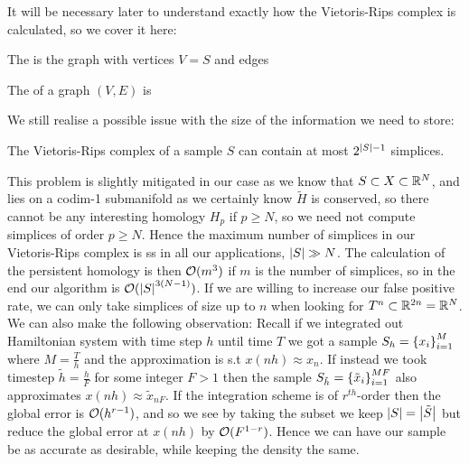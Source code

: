 \documentclass{article}
\begin{document}
\begin{aside}
	It will be necessary later to understand exactly how the Vietoris-Rips complex is calculated, so we cover it here:
	\begin{definition}
		The  is the graph with vertices $V=S$ and edges 
	\end{definition}
\begin{definition}
	The  of a graph $(V,E)$ is 
\end{definition}
\end{aside}

We still realise a possible issue with the size of the information we need to store:

\begin{lemma}
	The Vietoris-Rips complex of a sample $S$ can contain at most $2^{\left\lvert S \right\rvert-1}$ simplices.  
\end{lemma}

This problem is slightly mitigated in our case as we know that $S \subset X \subset \mathbb{R}^N$, and lies on a codim-1 submanifold as we certainly know $\tilde{H}$ is conserved, so there cannot be any interesting homology $H_p$ if $p \geq N$, so we need not compute simplices of order $p \geq N$. Hence the maximum number of simplices in our Vietoris-Rips complex is 
ss in all our applications, $\left\lvert S \right\rvert \gg N$. The calculation of the persistent homology is then $\mathcal{O}(m^3)$ if $m$ is the number of simplices, so in the end our algorithm is $\mathcal{O}(\left\lvert S \right\rvert^{3(N-1)})$. If we are willing to increase our false positive rate, we can only take simplices of size up to $n$ when looking for $T^n \subset \mathbb{R}^{2n}=\mathbb{R}^N$.\\
We can also make the following observation: Recall if we integrated out Hamiltonian system with time step $h$ until time $T$ we got a sample $S_h = \left\{ x_i \right\}_{i=1}^M$ where $M = \frac{T}{h}$ and the approximation is s.t $x(nh) \approx x_n$. If instead we took timestep $\tilde{h} = \frac{h}{F}$ for some integer $F>1$ then the sample $S_{\tilde{h}} = \left\{ \tilde{x}_i \right\}_{i=1}^{MF}$ also approximates $x(nh) \approx \tilde{x}_{nF}$. If the integration scheme is of $r^{th}$-order then the global error is $\mathcal{O}(h^{r-1})$, and so we see by taking the subset 
we keep $\left\lvert S \right\rvert= \left\lvert \tilde{S} \right\rvert$ but reduce the global error at $x(nh)$ by $\mathcal{O}(F^{1-r})$. Hence we can have our sample be as accurate as desirable, while keeping the density the same. 


\end{document}
